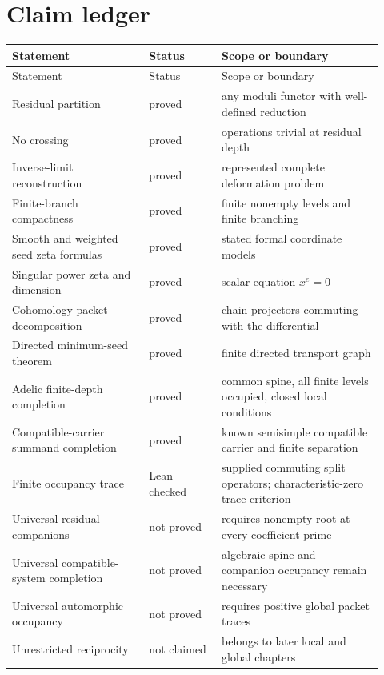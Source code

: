 \documentclass[11pt]{article}
\theoremstyle{definition}
\theoremstyle{remark}
\begin{document}
\section{Claim ledger}

\begin{longtable}{p{0.34\linewidth}p{0.18\linewidth}p{0.40\linewidth}}
\toprule
Statement & Status & Scope or boundary\\
\midrule
\endfirsthead
\toprule
Statement & Status & Scope or boundary\\
\midrule
\endhead
Residual partition & proved & any moduli functor with well-defined reduction\\
No crossing & proved & operations trivial at residual depth\\
Inverse-limit reconstruction & proved & represented complete deformation problem\\
Finite-branch compactness & proved & finite nonempty levels and finite branching\\
Smooth and weighted seed zeta formulas & proved & stated formal coordinate models\\
Singular power zeta and dimension & proved & scalar equation \(x^e=0\)\\
Cohomology packet decomposition & proved & chain projectors commuting with the differential\\
Directed minimum-seed theorem & proved & finite directed transport graph\\
Adelic finite-depth completion & proved & common spine, all finite levels occupied, closed local conditions\\
Compatible-carrier summand completion & proved & known semisimple compatible carrier and finite separation\\
Finite occupancy trace & Lean checked & supplied commuting split operators; characteristic-zero trace criterion\\
Universal residual companions & not proved & requires nonempty root at every coefficient prime\\
Universal compatible-system completion & not proved & algebraic spine and companion occupancy remain necessary\\
Universal automorphic occupancy & not proved & requires positive global packet traces\\
Unrestricted reciprocity & not claimed & belongs to later local and global chapters\\
\bottomrule
\end{longtable}
\end{document}
